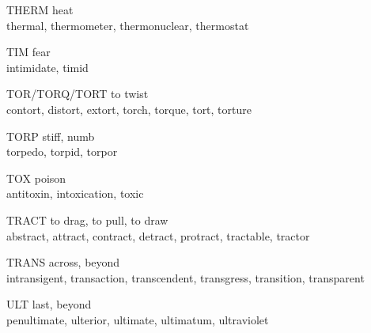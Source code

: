\begin{flashcard}[Roots]{THERM}
heat\\
\vspace{0.2in}
thermal, thermometer, thermonuclear, thermostat\\
\end{flashcard}

\begin{flashcard}[Roots]{TIM}
fear\\
\vspace{0.2in}
intimidate, timid\\
\end{flashcard}

\begin{flashcard}[Roots]{TOR/TORQ/TORT}
to twist\\
\vspace{0.2in}
contort, distort, extort, torch, torque, tort, torture\\
\end{flashcard}

\begin{flashcard}[Roots]{TORP}
stiff, numb\\
\vspace{0.2in}
torpedo, torpid, torpor\\
\end{flashcard}

\begin{flashcard}[Roots]{TOX}
poison\\
\vspace{0.2in}
antitoxin, intoxication, toxic\\
\end{flashcard}

\begin{flashcard}[Roots]{TRACT}
to drag, to pull, to draw\\
\vspace{0.2in}
abstract, attract, contract, detract, protract, tractable, tractor\\
\end{flashcard}

\begin{flashcard}[Roots]{TRANS}
across, beyond\\
\vspace{0.2in}
intransigent, transaction, transcendent, transgress, transition, transparent\\
\end{flashcard}

\begin{flashcard}[Roots]{ULT}
last, beyond\\
\vspace{0.2in}
penultimate, ulterior, ultimate, ultimatum, ultraviolet\\
\end{flashcard}

